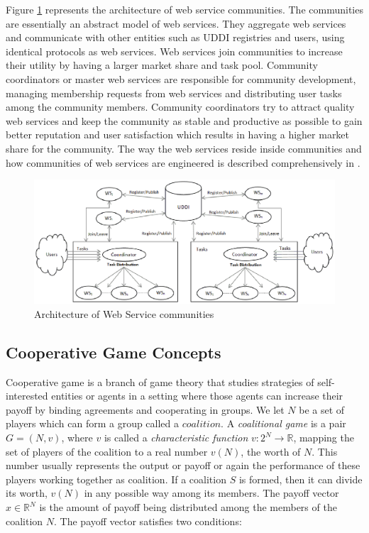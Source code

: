 \documentclass[10pt,journal,cspaper,compsoc]{IEEEtran}
\begin{document}
Figure \ref{fig_community} represents the architecture of web service communities. The communities are essentially an abstract model of web services. They aggregate web services and communicate with other entities such as UDDI registries and users, using identical protocols as web services. Web services join communities to increase their utility by having a larger market share and task pool. Community coordinators or master web services are responsible for community development, managing membership requests from web services and distributing user tasks among the community members. Community coordinators try to attract quality web services and keep the community as stable and productive as possible to gain better reputation and user satisfaction which results in having a higher market share for the community. The way the web services reside inside communities and how communities of web services are engineered is described comprehensively in \cite{DBLP:journals/ijebr/MaamarSTBB09}.

\begin{figure}[!t]
\centerline{\includegraphics[width=6.25in]{community.eps}}
\caption{Architecture of Web Service communities}
\label{fig_community}
\end{figure}

\subsection{Cooperative Game Concepts}
Cooperative game is a branch of game theory that studies
strategies of self-interested entities or agents in a setting
where those agents can increase their payoff by binding agreements
and cooperating in groups. We let $N$ be a set of players which can form a group called a $coalition$. A
\emph{coalitional game} is a pair $G = (N, v)$, where $v$ is called
a \emph{characteristic function} $v: 2^N \to \mathbb{R}$, mapping the set of players of the
coalition to a real number $v(N)$, the worth of $N$. This number
usually represents the output or payoff or again the performance
of these players working together as coalition.  If a coalition
$S$ is formed, then it can divide its worth, $v(N)$ in any
possible way among its members. The payoff vector $x \in
\mathbb{R}^N$ is the amount of payoff being distributed among the
members of the coalition $N$. The payoff vector satisfies two
conditions:
\end{document}
